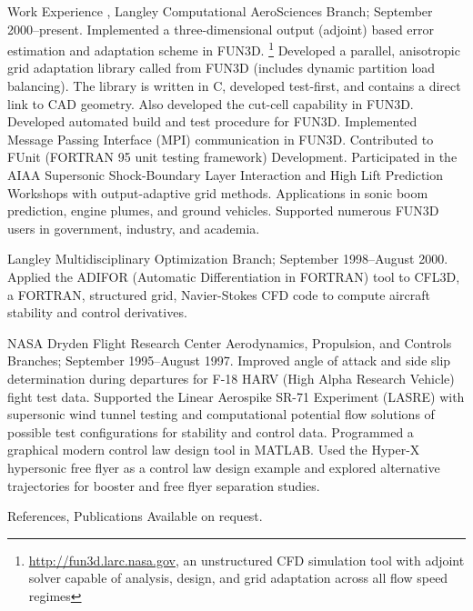 \documentclass{resume}
\begin{document}
\begin{category}{Work Experience}
, Langley Computational AeroSciences Branch;
September 2000--present.
Implemented a three-dimensional output (adjoint) based error
estimation and adaptation scheme in FUN3D.%
\footnote{\url{http://fun3d.larc.nasa.gov}, an unstructured CFD simulation tool with adjoint solver capable of analysis, design, and grid adaptation
across all flow speed regimes} 
Developed a parallel, anisotropic grid adaptation
library called from FUN3D (includes dynamic partition load balancing).
The library is
written in C, developed test-first, and contains a direct link to CAD geometry.
Also developed the cut-cell capability in FUN3D.
Developed automated build and test procedure for FUN3D.
Implemented Message Passing Interface (MPI) communication in FUN3D.
Contributed to FUnit (FORTRAN 95 unit testing framework) Development.
Participated in the AIAA Supersonic Shock-Boundary Layer Interaction and High Lift Prediction Workshops with output-adaptive grid methods.
Applications in sonic boom prediction, engine plumes, and ground vehicles.
Supported numerous FUN3D users in government, industry, and academia.

 Langley Multidisciplinary Optimization Branch;
September 1998--August 2000.
Applied the ADIFOR (Automatic Differentiation in FORTRAN) tool to
CFL3D, a FORTRAN, structured grid, Navier-Stokes CFD code to compute
aircraft stability and control derivatives.

NASA Dryden Flight Research Center Aerodynamics, Propulsion, and Controls
Branches; September 1995--August 1997. 
Improved angle of attack and
side slip determination during departures for F-18 HARV (High Alpha
Research Vehicle) fight test data. Supported the Linear Aerospike
SR-71 Experiment (LASRE) with supersonic wind tunnel testing and
computational potential flow solutions of possible test configurations
for stability and control data. Programmed a graphical modern control
law design tool in MATLAB. Used the Hyper-X hypersonic free flyer as a
control law design example and explored alternative trajectories for
booster and free flyer separation studies.


\end{category}


\begin{category}{References, Publications} 
\citemnobullet Available on request.
\end{category}
\end{document}
